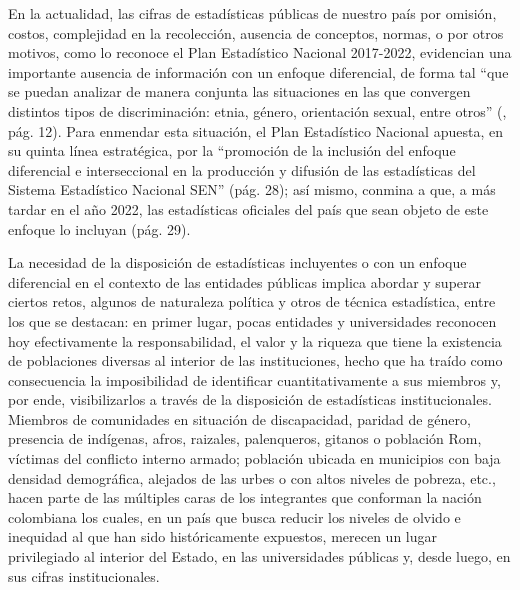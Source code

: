 \documentclass[
]{book}
\begin{document}
En la actualidad, las cifras de estadísticas públicas de nuestro país por omisión, costos, complejidad en la recolección, ausencia de conceptos, normas, o por otros motivos, como lo reconoce el Plan Estadístico Nacional 2017-2022, evidencian una importante ausencia de información con un enfoque diferencial, de forma tal ``que se puedan analizar de manera conjunta las situaciones en las que convergen distintos tipos de discriminación: etnia, género, orientación sexual, entre otros'' (\citet{Dane2017}, pág. 12). Para enmendar esta situación, el Plan Estadístico Nacional apuesta, en su quinta línea estratégica, por la ``promoción de la inclusión del enfoque diferencial e interseccional en la producción y difusión de las estadísticas del Sistema Estadístico Nacional SEN'' (pág. 28); así mismo, conmina a que, a más tardar en el año 2022, las estadísticas oficiales del país que sean objeto de este enfoque lo incluyan (pág. 29).

La necesidad de la disposición de estadísticas incluyentes o con un enfoque diferencial en el contexto de las entidades públicas implica abordar y superar ciertos retos, algunos de naturaleza política y otros de técnica estadística, entre los que se destacan: en primer lugar, pocas entidades y universidades reconocen hoy efectivamente la responsabilidad, el valor y la riqueza que tiene la existencia de poblaciones diversas al interior de las instituciones, hecho que ha traído como consecuencia la imposibilidad de identificar cuantitativamente a sus miembros y, por ende, visibilizarlos a través de la disposición de estadísticas institucionales. Miembros de comunidades en situación de discapacidad, paridad de género, presencia de indígenas, afros, raizales, palenqueros, gitanos o población Rom, víctimas del conflicto interno armado; población ubicada en municipios con baja densidad demográfica, alejados de las urbes o con altos niveles de pobreza, etc., hacen parte de las múltiples caras de los integrantes que conforman la nación colombiana los cuales, en un país que busca reducir los niveles de olvido e inequidad al que han sido históricamente expuestos, merecen un lugar privilegiado al interior del Estado, en las universidades públicas y, desde luego, en sus cifras institucionales.
\end{document}
